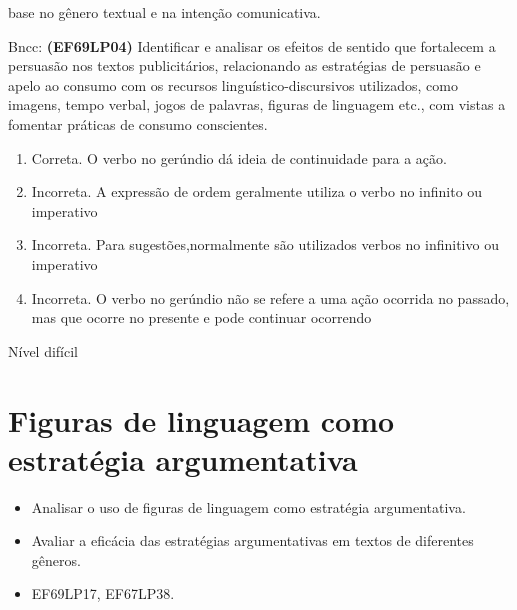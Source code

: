 {base no gênero textual e na intenção comunicativa.

Bncc: \textbf{(EF69LP04)} Identificar e analisar os efeitos de sentido
que fortalecem a persuasão nos textos publicitários, relacionando as
estratégias de persuasão e apelo ao consumo com os recursos
linguístico-discursivos utilizados, como imagens, tempo verbal, jogos de
palavras, figuras de linguagem etc., com vistas a fomentar práticas de
consumo conscientes.

\begin{enumerate}
\def\labelenumi{\arabic{enumi}.}
\item
  Correta. O verbo no gerúndio dá ideia de continuidade para a ação.
\item
  Incorreta. A expressão de ordem geralmente utiliza o verbo no infinito
  ou imperativo
\item
  Incorreta. Para sugestões,normalmente são utilizados verbos no
  infinitivo ou imperativo
\item
  Incorreta. O verbo no gerúndio não se refere a uma ação ocorrida no
  passado, mas que ocorre no presente e pode continuar ocorrendo
\end{enumerate}

Nível difícil


\chapter{Figuras de linguagem como estratégia argumentativa}


\begin{itemize}
  
  \item Analisar o uso de figuras de linguagem como estratégia argumentativa.

  \item Avaliar a eficácia das estratégias argumentativas em textos de diferentes gêneros.

\end{itemize}


\begin{itemize}

  \item EF69LP17, EF67LP38.

\end{itemize}

}
